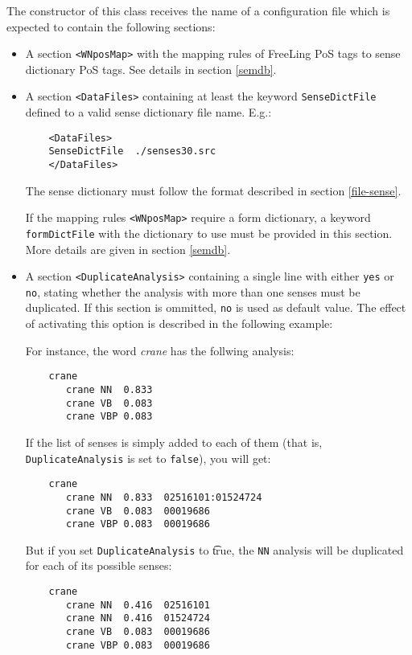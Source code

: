 \documentclass[a4paper]{book}
\begin{document}
   The constructor of this class receives the name of a configuration file
 which is expected to contain the following sections:
\begin{itemize}
\item A section \verb#<WNposMap># with the mapping rules of FreeLing PoS tags to
   sense dictionary PoS tags. See details in section \ref{semdb}.

\item A section \verb#<DataFiles># containing at least the keyword \verb#SenseDictFile#
   defined to a valid sense dictionary file name. E.g.:
  \begin{verbatim}
    <DataFiles>
    SenseDictFile  ./senses30.src
    </DataFiles>
  \end{verbatim}
    The sense dictionary must follow the format described in section \ref{file-sense}.

    If the mapping rules \verb#<WNposMap># require a form dictionary, a keyword
   \verb#formDictFile# with the dictionary to use must be provided in this section.
    More details are given in section \ref{semdb}.

\item A section \verb#<DuplicateAnalysis># containing a single line
  with either \verb#yes# or \verb#no#, stating whether the analysis
  with more than one senses must be duplicated. If this section is
  ommitted, \verb#no# is used as default value.
    The effect of activating this option is described in the following example:
  
  For instance, the word {\em crane} has the follwing analysis:
 \begin{verbatim}
    crane 
       crane NN  0.833
       crane VB  0.083
       crane VBP 0.083
 \end{verbatim}

  If the list of senses is simply added to each of them (that is,
  {\tt DuplicateAnalysis} is set to {\tt false}), you will get:
 \begin{verbatim}
    crane 
       crane NN  0.833  02516101:01524724
       crane VB  0.083  00019686
       crane VBP 0.083  00019686
 \end{verbatim}

   But if you set {\tt DuplicateAnalysis} to {\t true}, the {\tt NN}
   analysis will be duplicated for each of its possible senses:
 \begin{verbatim}
    crane 
       crane NN  0.416  02516101
       crane NN  0.416  01524724
       crane VB  0.083  00019686
       crane VBP 0.083  00019686
 \end{verbatim}
\end{itemize}
\end{document}
